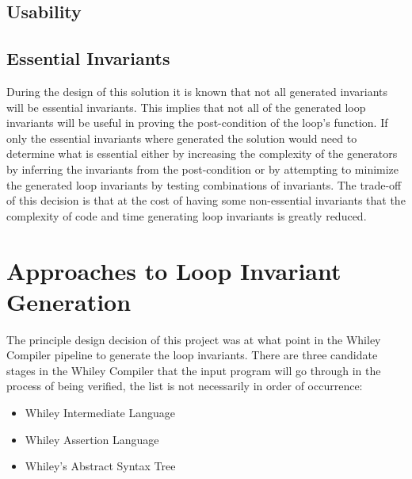 \subsection{Usability}



\subsection{Essential Invariants}

During the design of this solution it is known that not all generated
invariants will be essential invariants.
This implies that not all of the generated loop invariants will be useful
in proving the post-condition of the loop's function.
If only the essential invariants where generated the solution would need
to determine what is essential either by increasing the complexity of the
generators by inferring the invariants from the post-condition or by 
attempting to minimize the generated loop invariants by testing combinations 
of invariants.
The trade-off of this decision is that at the cost of having some non-essential
invariants that the complexity of code and time generating loop invariants is
greatly reduced.

\section{Approaches to Loop Invariant Generation}

The principle design decision of this project was at
what point in the Whiley Compiler pipeline
to generate the loop invariants.
There are three candidate stages in the Whiley Compiler
that the input program will go through in the process of
being verified, the list is not necessarily in order of occurrence:

\begin{itemize}
    \item{Whiley Intermediate Language}
    \item{Whiley Assertion Language}
    \item{Whiley's Abstract Syntax Tree}
\end{itemize}

